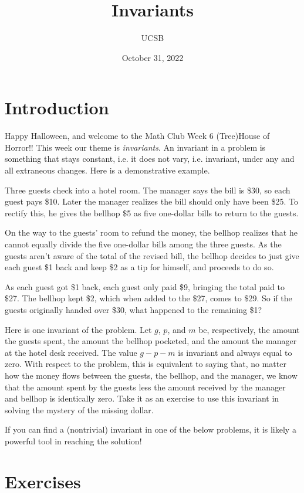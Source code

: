 \documentclass{article}
\title{Invariants}
\author{UCSB}
\date{October 31, 2022}
\begin{document}
\section*{Introduction}
Happy Halloween, and welcome to the Math Club Week 6 (Tree)House of Horror!!
This week our theme is \emph{invariants}.
An invariant in a problem is something that stays constant, i.e. it does not vary, i.e. invariant, under any and all extraneous changes.
Here is a demonstrative example.
\begin{example}
    Three guests check into a hotel room. 
    The manager says the bill is \$30, so each guest pays \$10. Later the manager realizes the bill should only have been \$25.
    To rectify this, he gives the bellhop \$5 as five one-dollar bills to return to the guests.
    
    On the way to the guests' room to refund the money, the bellhop realizes that he cannot equally divide the five one-dollar bills among the three guests.
    As the guests aren't aware of the total of the revised bill, the bellhop decides to just give each guest \$1 back and keep \$2 as a tip for himself, and proceeds to do so.

    As each guest got \$1 back, each guest only paid \$9, bringing the total paid to \$27.
    The bellhop kept \$2, which when added to the \$27, comes to \$29.
    So if the guests originally handed over \$30, what happened to the remaining \$1?
    
    Here is one invariant of the problem. 
    Let \(g\), \(p\), and \(m\) be, respectively, the amount the guests spent, the amount the bellhop pocketed, and the amount the manager at the hotel desk received. 
    The value \(g-p-m\) is invariant and always equal to zero.
    With respect to the problem, this is equivalent to saying that, no matter how the money flows between the guests, the bellhop, and the manager, we know that the amount spent by the guests less the amount received by the manager and bellhop is identically zero.
    Take it as an exercise to use this invariant in solving the mystery of the missing dollar.
\end{example}

If you can find a (nontrivial) invariant in one of the below problems, it is likely a powerful tool in reaching the solution!

\section*{Exercises}
\end{document}
